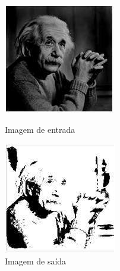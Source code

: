 \documentclass[a4paper, 12pt]{article}
\begin{document}
\begin{figure}[!htb]
	\centering
	  \includegraphics[width=\linewidth]{images/einsteinEscuro.jpg}
	  \caption{Imagem de entrada}
	\endminipage\hspace{1cm}
	  \includegraphics[scale=0.62]{images/claro.jpg}
	  \caption{Imagem de saída}
	\endminipage
\end{figure}
\end{document}
